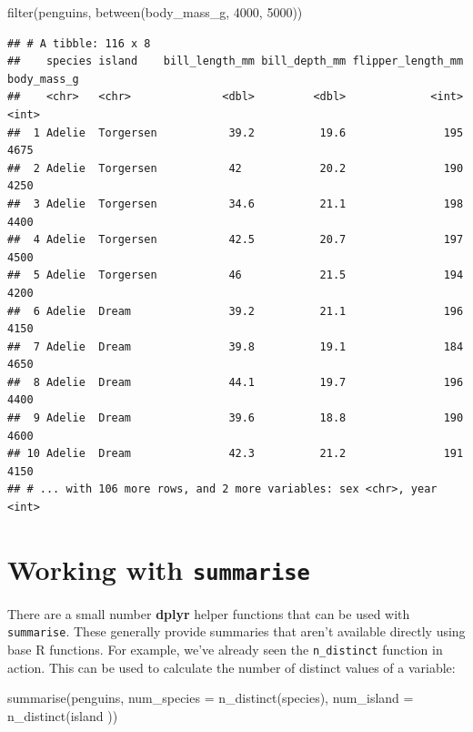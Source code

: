 \documentclass[
]{book}
\newenvironment{Shaded}{\begin{snugshade}}{\end{snugshade}}
\newcommand{\AttributeTok}[1]{\textcolor[rgb]{0.77,0.63,0.00}{#1}}
\newcommand{\DecValTok}[1]{\textcolor[rgb]{0.00,0.00,0.81}{#1}}
\newcommand{\FunctionTok}[1]{\textcolor[rgb]{0.00,0.00,0.00}{#1}}
\newcommand{\NormalTok}[1]{#1}
\begin{document}
\begin{Shaded}
\begin{Highlighting}[]
\FunctionTok{filter}\NormalTok{(penguins, }\FunctionTok{between}\NormalTok{(body\_mass\_g, }\DecValTok{4000}\NormalTok{, }\DecValTok{5000}\NormalTok{))}
\end{Highlighting}
\end{Shaded}

\begin{verbatim}
## # A tibble: 116 x 8
##    species island    bill_length_mm bill_depth_mm flipper_length_mm body_mass_g
##    <chr>   <chr>              <dbl>         <dbl>             <int>       <int>
##  1 Adelie  Torgersen           39.2          19.6               195        4675
##  2 Adelie  Torgersen           42            20.2               190        4250
##  3 Adelie  Torgersen           34.6          21.1               198        4400
##  4 Adelie  Torgersen           42.5          20.7               197        4500
##  5 Adelie  Torgersen           46            21.5               194        4200
##  6 Adelie  Dream               39.2          21.1               196        4150
##  7 Adelie  Dream               39.8          19.1               184        4650
##  8 Adelie  Dream               44.1          19.7               196        4400
##  9 Adelie  Dream               39.6          18.8               190        4600
## 10 Adelie  Dream               42.3          21.2               191        4150
## # ... with 106 more rows, and 2 more variables: sex <chr>, year <int>
\end{verbatim}

\hypertarget{working-with-summarise}{%
\section{\texorpdfstring{Working with \texttt{summarise}}{Working with summarise}}\label{working-with-summarise}}

There are a small number \textbf{dplyr} helper functions that can be used with \texttt{summarise}. These generally provide summaries that aren't available directly using base R functions. For example, we've already seen the \texttt{n\_distinct} function in action. This can be used to calculate the number of distinct values of a variable:

\begin{Shaded}
\begin{Highlighting}[]
\FunctionTok{summarise}\NormalTok{(penguins, }
          \AttributeTok{num\_species =} \FunctionTok{n\_distinct}\NormalTok{(species),}
          \AttributeTok{num\_island  =} \FunctionTok{n\_distinct}\NormalTok{(island ))}
\end{Highlighting}
\end{Shaded}
\end{document}
